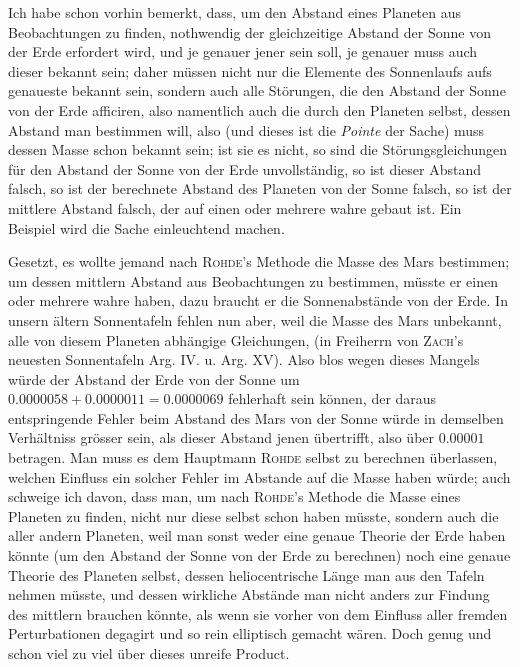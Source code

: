 Ich habe schon vorhin bemerkt, dass, um den Abstand eines Planeten aus Beobachtungen zu finden, nothwendig der gleichzeitige Abstand der Sonne von der Erde erfordert wird, und je genauer jener sein soll, je genauer muss auch dieser bekannt sein; daher müssen nicht nur die Elemente des Sonnenlaufs aufs genaueste bekannt sein, sondern auch alle Störungen, die den Abstand der Sonne von der Erde afficiren, also namentlich auch die durch den Planeten selbst, dessen Abstand man bestimmen will, also (und dieses ist die \emph{Pointe} der Sache) muss dessen Masse schon bekannt sein; ist sie es nicht, so sind die Störungsgleichungen für den Abstand der Sonne von der Erde unvollständig, so ist dieser Abstand falsch, so ist der berechnete Abstand des Planeten von der Sonne falsch, so ist der mittlere Abstand falsch, der auf einen oder mehrere wahre gebaut ist. Ein Beispiel wird die Sache einleuchtend machen.

Gesetzt, es wollte jemand nach \textsc{Rohde}'s Methode die Masse des Mars bestimmen; um dessen mittlern Abstand aus Beobachtungen zu bestimmen, müsste er einen oder mehrere wahre haben, dazu braucht er die Sonnenabstände von der Erde. In unsern ältern Sonnentafeln fehlen nun aber, weil die Masse des Mars unbekannt, alle von diesem Planeten abhängige Gleichungen, (in Freiherrn von \textsc{Zach}'s neuesten Sonnentafeln Arg. IV. u. Arg. XV). Also blos wegen dieses Mangels würde der Abstand der Erde von der Sonne um $0.0000058 + 0.0000011 = 0.0000069$ fehlerhaft sein können, der daraus entspringende Fehler beim Abstand des Mars von der Sonne würde in demselben Verhältniss grösser sein, als dieser Abstand jenen übertrifft, also über $0.00001$ betragen. Man muss es dem Hauptmann \textsc{Rohde} selbst zu berechnen überlassen, welchen Einfluss ein solcher Fehler im Abstande auf die Masse haben würde; auch schweige ich davon, dass man, um nach \textsc{Rohde}'s Methode die Masse eines Planeten zu finden, nicht nur diese selbst schon haben müsste, sondern auch die aller andern Planeten, weil man sonst weder eine genaue Theorie der Erde haben könnte (um den Abstand der Sonne von der Erde zu berechnen) noch eine genaue Theorie des Planeten selbst, dessen heliocentrische Länge man aus den Tafeln nehmen müsste, und dessen wirkliche Abstände man nicht anders zur Findung des mittlern brauchen könnte, als wenn sie vorher von dem Einfluss aller fremden Perturbationen degagirt und so rein elliptisch gemacht wären. Doch genug und schon viel zu viel über dieses unreife Product.

